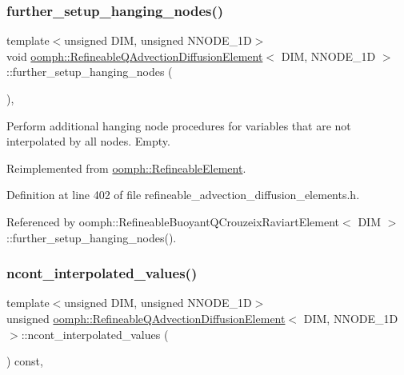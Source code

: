 \subsubsection{\texorpdfstring{further\+\_\+setup\+\_\+hanging\+\_\+nodes()}{further\_setup\_hanging\_nodes()}}
{\footnotesize\ttfamily template$<$unsigned D\+IM, unsigned N\+N\+O\+D\+E\+\_\+1D$>$ \\
void \hyperlink{classoomph_1_1RefineableQAdvectionDiffusionElement}{oomph\+::\+Refineable\+Q\+Advection\+Diffusion\+Element}$<$ D\+IM, N\+N\+O\+D\+E\+\_\+1D $>$\+::further\+\_\+setup\+\_\+hanging\+\_\+nodes (\begin{DoxyParamCaption}{ }\end{DoxyParamCaption})\hspace{0.3cm}{\ttfamily [inline]}, {\ttfamily [virtual]}}



Perform additional hanging node procedures for variables that are not interpolated by all nodes. Empty. 



Reimplemented from \hyperlink{classoomph_1_1RefineableElement_a86ea01c485f7ff822dce74b884312ccb}{oomph\+::\+Refineable\+Element}.



Definition at line 402 of file refineable\+\_\+advection\+\_\+diffusion\+\_\+elements.\+h.



Referenced by oomph\+::\+Refineable\+Buoyant\+Q\+Crouzeix\+Raviart\+Element$<$ D\+I\+M $>$\+::further\+\_\+setup\+\_\+hanging\+\_\+nodes().

\mbox{\label{classoomph_1_1RefineableQAdvectionDiffusionElement_acc6081866ab4080702515823f1eea83c}} 
\subsubsection{\texorpdfstring{ncont\+\_\+interpolated\+\_\+values()}{ncont\_interpolated\_values()}}
{\footnotesize\ttfamily template$<$unsigned D\+IM, unsigned N\+N\+O\+D\+E\+\_\+1D$>$ \\
unsigned \hyperlink{classoomph_1_1RefineableQAdvectionDiffusionElement}{oomph\+::\+Refineable\+Q\+Advection\+Diffusion\+Element}$<$ D\+IM, N\+N\+O\+D\+E\+\_\+1D $>$\+::ncont\+\_\+interpolated\+\_\+values (\begin{DoxyParamCaption}{ }\end{DoxyParamCaption}) const\hspace{0.3cm}{\ttfamily [inline]}, {\ttfamily [virtual]}}



